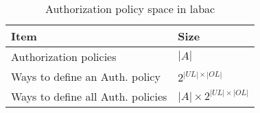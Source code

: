 \begin{table}
\centering
\caption{Authorization policy space in labac{}}
\label{tab:policy-enumeration}
\begin{tabular}{|l|l|}
\hline
\textbf{Item}                                           & \textbf{Size}               \\ \hline
Authorization policies                   & $ |A|$                       \\ \hline
Ways to define an Auth. policy       & $2^ {|UL| \times |OL|}$             \\ \hline
Ways to define all Auth. policies & $  |A| \times 2^{|UL| \times |OL|}$ \\ \hline
\end{tabular}
\end{table}